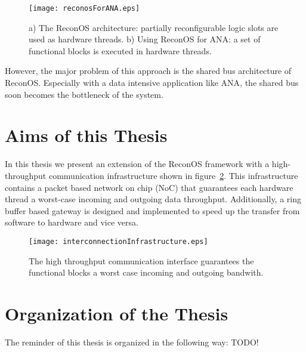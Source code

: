 \begin{figure}
  \begin{center}
		 \texttt{[image: reconosForANA.eps]}
  \caption{a) The ReconOS architecture: partially reconfigurable logic slots are used as hardware threads. b) Using ReconOS for ANA: a set of functional blocks is executed in hardware threads.}
  \label{reconosForAna.eps}
  \end{center}
\end{figure}
However, the major problem of this approach is the shared bus architecture of ReconOS. Especially with a data intensive application like ANA, the shared bus soon becomes the bottleneck of the system. 

\section{Aims of this Thesis}
In this thesis we present an extension of the ReconOS framework with a high-throughput communication infrastructure shown in figure~\ref{interconnectionInfrastructure.eps}. This infrastructure contains a packet based network on chip (NoC) that guarantees each hardware thread a worst-case incoming and outgoing data throughput. Additionally, a ring buffer based gateway is designed and implemented to speed up the transfer from software to hardware and vice versa.

\begin{figure}
  \begin{center}
		 \texttt{[image: interconnectionInfrastructure.eps]}
  \caption{The high throughput communication interface guarantees the functional blocks a worst case incoming and outgoing bandwith.}
  \label{interconnectionInfrastructure.eps}
  \end{center}
\end{figure}

\section{Organization of the Thesis}
The reminder of this thesis is organized in the following way: TODO!